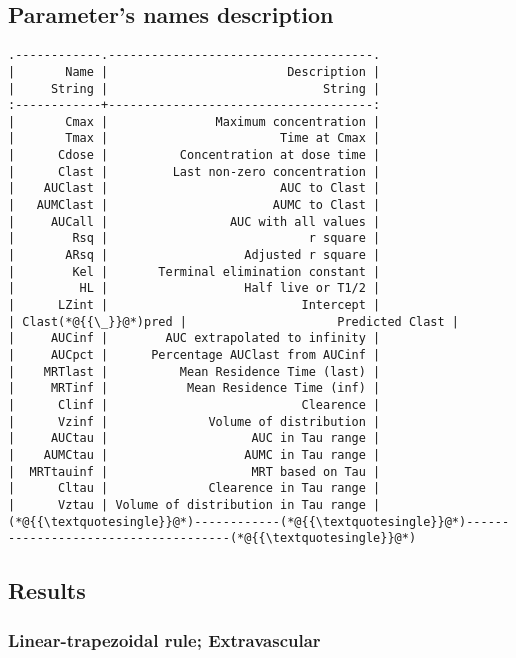 \documentclass[12pt,a4paper]{article}
\begin{document}
\subsection{Parameter's names description}

\begin{lstlisting}
.------------.-------------------------------------.
|       Name |                         Description |
|     String |                              String |
:------------+-------------------------------------:
|       Cmax |               Maximum concentration |
|       Tmax |                        Time at Cmax |
|      Cdose |          Concentration at dose time |
|      Clast |         Last non-zero concentration |
|    AUClast |                        AUC to Clast |
|   AUMClast |                       AUMC to Clast |
|     AUCall |                 AUC with all values |
|        Rsq |                            r square |
|       ARsq |                   Adjusted r square |
|        Kel |       Terminal elimination constant |
|         HL |                   Half live or T1/2 |
|      LZint |                           Intercept |
| Clast(*@{{\_}}@*)pred |                     Predicted Clast |
|     AUCinf |        AUC extrapolated to infinity |
|     AUCpct |      Percentage AUClast from AUCinf |
|    MRTlast |          Mean Residence Time (last) |
|     MRTinf |           Mean Residence Time (inf) |
|      Clinf |                           Clearence |
|      Vzinf |              Volume of distribution |
|     AUCtau |                    AUC in Tau range |
|    AUMCtau |                   AUMC in Tau range |
|  MRTtauinf |                    MRT based on Tau |
|      Cltau |              Clearence in Tau range |
|      Vztau | Volume of distribution in Tau range |
(*@{{\textquotesingle}}@*)------------(*@{{\textquotesingle}}@*)-------------------------------------(*@{{\textquotesingle}}@*)
\end{lstlisting}


\subsection{Results}
\subsubsection{Linear-trapezoidal rule; Extravascular}
\end{document}
